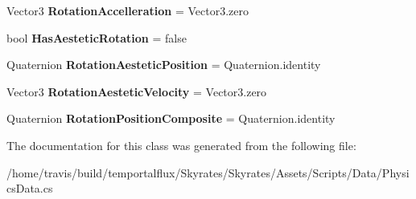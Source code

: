 \begin{DoxyCompactItemize}
\item 
\hypertarget{class_skyrates_1_1_physics_1_1_physics_data_a209363b1f43546236f5704ed3c122df3}{Vector3 {\bfseries Rotation\-Accelleration} = Vector3.\-zero}\label{class_skyrates_1_1_physics_1_1_physics_data_a209363b1f43546236f5704ed3c122df3}

\item 
\hypertarget{class_skyrates_1_1_physics_1_1_physics_data_a19e1712e04af8d00617d843cf1c12f78}{bool {\bfseries Has\-Aestetic\-Rotation} = false}\label{class_skyrates_1_1_physics_1_1_physics_data_a19e1712e04af8d00617d843cf1c12f78}

\item 
\hypertarget{class_skyrates_1_1_physics_1_1_physics_data_afa6827cbf29875a9019dff4361d1fee3}{Quaternion {\bfseries Rotation\-Aestetic\-Position} = Quaternion.\-identity}\label{class_skyrates_1_1_physics_1_1_physics_data_afa6827cbf29875a9019dff4361d1fee3}

\item 
\hypertarget{class_skyrates_1_1_physics_1_1_physics_data_a31279ad7cb69f4bdf828968c73275609}{Vector3 {\bfseries Rotation\-Aestetic\-Velocity} = Vector3.\-zero}\label{class_skyrates_1_1_physics_1_1_physics_data_a31279ad7cb69f4bdf828968c73275609}

\item 
\hypertarget{class_skyrates_1_1_physics_1_1_physics_data_add0228d6f6ce40584d198baed62a2501}{Quaternion {\bfseries Rotation\-Position\-Composite} = Quaternion.\-identity}\label{class_skyrates_1_1_physics_1_1_physics_data_add0228d6f6ce40584d198baed62a2501}

\end{DoxyCompactItemize}


The documentation for this class was generated from the following file\-:\begin{DoxyCompactItemize}
\item 
/home/travis/build/temportalflux/\-Skyrates/\-Skyrates/\-Assets/\-Scripts/\-Data/Physics\-Data.\-cs\end{DoxyCompactItemize}
